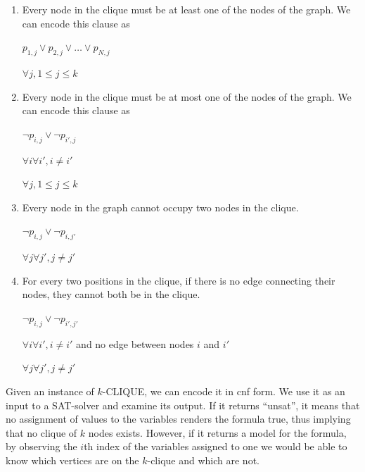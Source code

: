 \begin{enumerate}
  \item Every node in the clique must be at least one of the nodes of the graph. We can encode this clause as
  
  \begin{center}$p_{1,j} \lor p_{2,j} \lor \ldots \lor p_{N,j}$\end{center}  
  \begin{center}$\forall j, 1 \leq j \leq k$\end{center}
  
  \item Every node in the clique must be at most one of the nodes of the graph. We can encode this clause as
  
  \begin{center}$\neg p_{i,j} \lor \neg p_{i',j}$ \end{center} 
  \begin{center}$\forall i \forall i', i \neq i'$ \end{center} 
  \begin{center}$\forall j, 1 \leq j \leq k$ \end{center} 
  
  \item Every node in the graph cannot occupy two nodes in the clique.
  
  \begin{center}$\neg p_{i,j} \lor \neg p_{i,j'}$ \end{center} 
  \begin{center}$\forall j \forall j', j \neq j'$ \end{center}  
  
  \item For every two positions in the clique, if there is no edge connecting their nodes, they cannot both be in the clique.
  
  \begin{center}$\neg p_{i,j} \lor \neg p_{i',j'}$ \end{center} 
  \begin{center}$\forall i \forall i', i \neq i'$ and no edge between nodes $i$ and $i'$ \end{center} 
  \begin{center}$\forall j \forall j', j \neq j'$ \end{center}  
  
\end{enumerate}

Given an instance of $k$-CLIQUE, we can encode it in \gls{cnf} form. We use it as an input to a SAT-solver and examine its output. If it returns ``unsat'', it means that no assignment of values to the variables renders the formula true, thus implying that no clique of $k$ nodes exists. However, if it returns a model for the formula, by observing the $i$th index of the variables assigned to one we would be able to know which vertices are on the $k$-clique and which are not. \\

